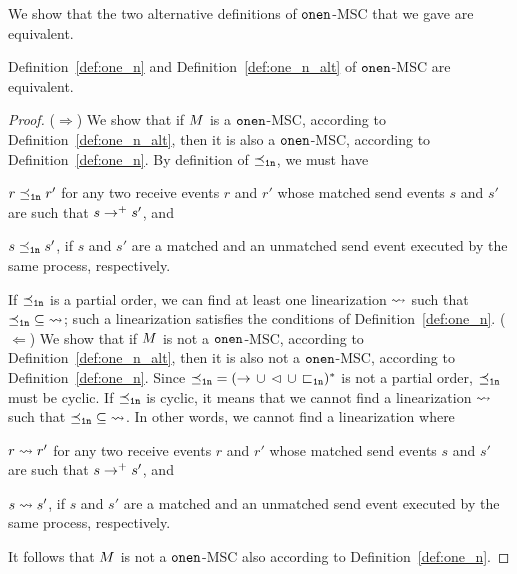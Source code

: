 We show  that the two alternative definitions of $\mathtt{onen}$-MSC that we gave are equivalent.

\begin{proposition}
    Definition~\ref{def:one_n} and Definition~\ref{def:one_n_alt} of $\mathtt{onen}$-MSC are equivalent.
\end{proposition}
\begin{proof}
    ($\Rightarrow$)  We show that if $M$ is a $\mathtt{onen}$-MSC, according to Definition~\ref{def:one_n_alt}, then it is also a $\mathtt{onen}$-MSC, according to Definition~\ref{def:one_n}. By definition of $\preceq_{\mathtt{1n}}$, we must have 
    \begin{enumerate*}[label={(\roman*)}]
        \item $r \preceq_{\mathtt{1n}} r'$ for any two receive events $r$ and $r'$ whose matched send events $s$ and $s'$ are such that $s \to^+ s'$, and
        \item $s \preceq_{\mathtt{1n}} s'$, if $s$ and $s'$ are a matched and an unmatched send event executed by the same process, respectively.
    \end{enumerate*} 
    If $\preceq_{\mathtt{1n}}$ is a partial order, we can find at least one linearization $\rightsquigarrow$ such that $\preceq_{\mathtt{1n}} \;\subseteq\; \rightsquigarrow$; such a linearization satisfies the conditions of Definition~\ref{def:one_n}.\newline
    ($\Leftarrow$) We show that if $M$ is not a $\mathtt{onen}$-MSC, according to Definition~\ref{def:one_n_alt}, then it is also not a $\mathtt{onen}$-MSC, according to Definition~\ref{def:one_n}. Since ${\preceq_{\mathtt{1n}}} = ({\to} \,\cup\, {\lhd} \,\cup\, {\sqsubset_{\mathtt{1n}}})^\ast$ is not a partial order, $\preceq_{\mathtt{1n}}$ must be cyclic. If $\preceq_{\mathtt{1n}}$ is cyclic, it means that we cannot find a linearization $\rightsquigarrow$ such that $\preceq_{\mathtt{1n}} \;\subseteq\; \rightsquigarrow$. In other words, we cannot find a linearization where      
    \begin{enumerate*}[label={(\roman*)}]
        \item $r \rightsquigarrow r'$ for any two receive events $r$ and $r'$ whose matched send events $s$ and $s'$ are such that $s \to^+ s'$, and
        \item $s \rightsquigarrow s'$, if $s$ and $s'$ are a matched and an unmatched send event executed by the same process, respectively.
    \end{enumerate*} 
    It follows that $M$ is not a $\mathtt{onen}$-MSC also according to Definition~\ref{def:one_n}.
\end{proof}

